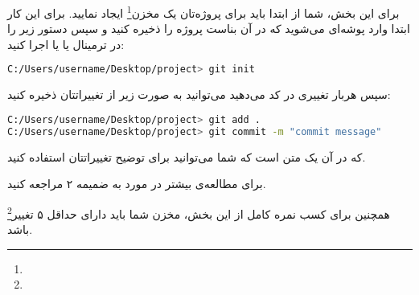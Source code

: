 برای این بخش، شما از ابتدا باید برای پروژه‌تان یک مخزن\footnote{}  ایجاد نمایید. برای این کار ابتدا وارد پوشه‌ای می‌شوید که در آن بناست پروژه را ذخیره کنید و سپس دستور زیر را در ترمینال یا  یا  اجرا کنید:

\begin{terminal}
    \begin{lstlisting}[language=bash]
C:/Users/username/Desktop/project> git init
    \end{lstlisting}
\end{terminal}

سپس هربار تغییری در کد می‌دهید می‌توانید به صورت زیر از تغییراتتان ذخیره کنید:

\begin{terminal}
    \begin{lstlisting}[language=bash]
C:/Users/username/Desktop/project> git add .
C:/Users/username/Desktop/project> git commit -m "commit message"
    \end{lstlisting}
\end{terminal}

که در آن  یک متن است که شما می‌توانید برای توضیح تغییراتتان استفاده کنید.

برای مطالعه‌ی بیشتر در مورد  به ضمیمه ۲ مراجعه کنید.

همچنین برای کسب نمره کامل از این بخش، مخزن  شما باید دارای حداقل ۵ تغییر\footnote{} باشد.